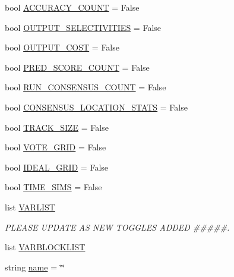 \begin{DoxyCompactItemize}
\item 
bool \mbox{\hyperlink{namespacedynamicfilterapp_1_1toggles_ae898ca1b1c4681151406ecc2921a738b}{A\+C\+C\+U\+R\+A\+C\+Y\+\_\+\+C\+O\+U\+NT}} = False
\item 
bool \mbox{\hyperlink{namespacedynamicfilterapp_1_1toggles_ac8f124f313b63d29e1664ff5fc7a049f}{O\+U\+T\+P\+U\+T\+\_\+\+S\+E\+L\+E\+C\+T\+I\+V\+I\+T\+I\+ES}} = False
\item 
bool \mbox{\hyperlink{namespacedynamicfilterapp_1_1toggles_a2c3c37ecd0a669270751ba1fcdc0439f}{O\+U\+T\+P\+U\+T\+\_\+\+C\+O\+ST}} = False
\item 
bool \mbox{\hyperlink{namespacedynamicfilterapp_1_1toggles_a28f8ae2e702ca2e2112db9629538fc72}{P\+R\+E\+D\+\_\+\+S\+C\+O\+R\+E\+\_\+\+C\+O\+U\+NT}} = False
\item 
bool \mbox{\hyperlink{namespacedynamicfilterapp_1_1toggles_ab852b5e6373777202ed3eabdf511f026}{R\+U\+N\+\_\+\+C\+O\+N\+S\+E\+N\+S\+U\+S\+\_\+\+C\+O\+U\+NT}} = False
\item 
bool \mbox{\hyperlink{namespacedynamicfilterapp_1_1toggles_ad7f3dbdec359eb538bf1890793d541ad}{C\+O\+N\+S\+E\+N\+S\+U\+S\+\_\+\+L\+O\+C\+A\+T\+I\+O\+N\+\_\+\+S\+T\+A\+TS}} = False
\item 
bool \mbox{\hyperlink{namespacedynamicfilterapp_1_1toggles_a2051e4cd9bae895351ea7a73696fd815}{T\+R\+A\+C\+K\+\_\+\+S\+I\+ZE}} = False
\item 
bool \mbox{\hyperlink{namespacedynamicfilterapp_1_1toggles_abd2acb6c03d6ca650537592475fc69e4}{V\+O\+T\+E\+\_\+\+G\+R\+ID}} = False
\item 
bool \mbox{\hyperlink{namespacedynamicfilterapp_1_1toggles_a42311c82a77ac3b1c03bf7b9c6619be2}{I\+D\+E\+A\+L\+\_\+\+G\+R\+ID}} = False
\item 
bool \mbox{\hyperlink{namespacedynamicfilterapp_1_1toggles_a3dd608f63971ae7536ce7be96396c510}{T\+I\+M\+E\+\_\+\+S\+I\+MS}} = False
\item 
list \mbox{\hyperlink{namespacedynamicfilterapp_1_1toggles_abad4087652ccca08b33c499c7aad17b0}{V\+A\+R\+L\+I\+ST}}
\begin{DoxyCompactList}\small\item\em P\+L\+E\+A\+SE U\+P\+D\+A\+TE AS N\+EW T\+O\+G\+G\+L\+ES A\+D\+D\+ED \#\#\#\#\#. \end{DoxyCompactList}\item 
list \mbox{\hyperlink{namespacedynamicfilterapp_1_1toggles_aa02a2d2c1773074f98b23ad1078b99da}{V\+A\+R\+B\+L\+O\+C\+K\+L\+I\+ST}}
\item 
string \mbox{\hyperlink{namespacedynamicfilterapp_1_1toggles_a8ccf841cb59e451791bcb2e1ac4f1edc}{name}} = \char`\"{}\char`\"{}
\end{DoxyCompactItemize}


